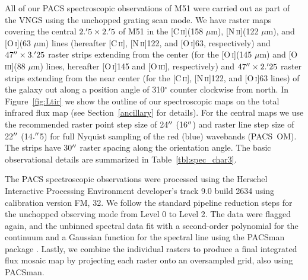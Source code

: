 All of our PACS spectroscopic observations of M51 were carried out as part of the VNGS using the unchopped grating scan mode.  We have raster maps covering the central $2.\mbox{$^\prime$}5 \times 2.\mbox{$^\prime$}5$ of M51 in the [C\,\textsc{ii}](158 $\mu$m), [N\,\textsc{ii}](122 $\mu$m), and [O\,\textsc{i}](63 $\mu$m) lines (hereafter [C\,\textsc{ii}], [N\,\textsc{ii}]122, and [O\,\textsc{i}]63, respectively) and $47\mbox{$^{\prime\prime}$} \times 3.\mbox{$^\prime$}25$ raster strips extending from the center (for the [O\,\textsc{i}](145 $\mu$m) and [O\,\textsc{iii}](88 $\mu$m) lines, hereafter [O\,\textsc{i}]145 and [O\,\textsc{iii}], respectively) and $47\mbox{$^{\prime\prime}$} \times 2.\mbox{$^\prime$}25$ raster strips extending from the near center (for the [C\,\textsc{ii}], [N\,\textsc{ii}]122, and [O\,\textsc{i}]63 lines) of the galaxy out along a position angle of 310$^{\circ}$ counter clockwise from north.   In Figure~\ref{fig:Ltir} we show the outline of our spectroscopic maps on the total infrared flux map (see Section~\ref{ancillary} for details).  For the central maps we use the recommended raster point step size of 24$\mbox{$^{\prime\prime}$}$ (16$\mbox{$^{\prime\prime}$}$) and raster line step size of 22$\mbox{$^{\prime\prime}$}$ (14$.\mbox{$^{\prime\prime}$}$5) for full Nyquist sampling of the red (blue) wavebands (PACS~OM).  The strips have 30$\mbox{$^{\prime\prime}$}$ raster spacing along the orientation angle.  The basic observational details are summarized in Table~\ref{tbl:spec_char3}.

The PACS spectroscopic observations were processed using the Herschel Interactive Processing Environment \citep[HIPE; ][]{2010ASPC..434..139O} developer's track 9.0 build 2634 using calibration version FM, 32.  We follow the standard pipeline reduction steps for the unchopped observing mode from Level 0 to Level 2. The data were flagged again, and the unbinned spectral data fit with a second-order polynomial for the continuum and a Gaussian function for the spectral line using the PACSman package \citep{2012A&A...548A..91L}.  Lastly, we combine the individual rasters to produce a final integrated flux mosaic map by projecting each raster onto an oversampled grid, also using PACSman.


